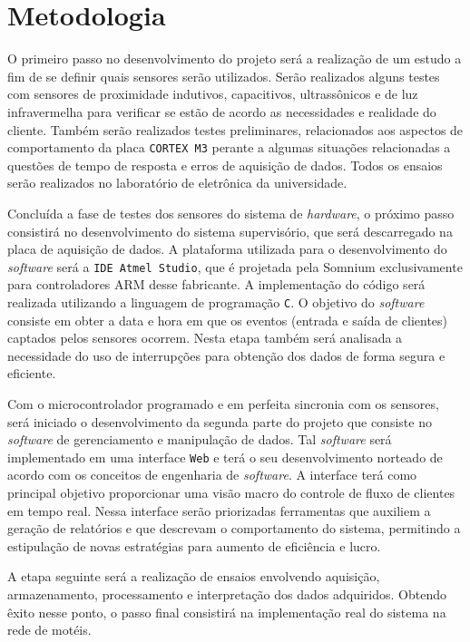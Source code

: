 \chapter[Metodologia]{Metodologia}

O primeiro passo no desenvolvimento do projeto será a realização de um estudo a fim de se definir quais sensores serão utilizados. 
Serão realizados alguns testes com sensores de proximidade indutivos, capacitivos, ultrassônicos e de luz infravermelha para verificar
se estão de acordo as necessidades e realidade do cliente. Também serão realizados testes preliminares, relacionados aos aspectos de 
comportamento da placa \texttt{CORTEX M3} perante a algumas situações relacionadas a questões de tempo de resposta e erros de aquisição de dados. 
Todos os ensaios serão realizados no laboratório de eletrônica da universidade.

Concluída a fase de testes dos sensores do sistema de \textit{hardware}, o próximo passo consistirá no desenvolvimento do sistema supervisório, 
que será descarregado na placa de aquisição de dados. A plataforma utilizada para o desenvolvimento do \textit{software} será a \texttt{IDE Atmel Studio}, 
que é projetada pela Somnium exclusivamente para controladores ARM desse fabricante. A implementação do código será realizada utilizando 
a linguagem de programação \texttt{C}. O objetivo do \textit{software} consiste em obter a data e hora em que os eventos (entrada e saída de clientes) 
captados pelos sensores ocorrem. Nesta etapa também será analisada a necessidade do uso de interrupções para obtenção dos dados de forma 
segura e eficiente.

Com o microcontrolador programado e em perfeita sincronia com os sensores, será iniciado o desenvolvimento da segunda parte do projeto 
que consiste no \textit{software} de gerenciamento e manipulação de dados. Tal \textit{software} será implementado em uma interface \texttt{Web} e terá o seu 
desenvolvimento norteado de acordo com os conceitos de engenharia de \textit{software}. A interface terá como principal objetivo proporcionar 
uma visão macro do controle de fluxo de clientes em tempo real. Nessa interface serão priorizadas ferramentas que auxiliem a geração de 
relatórios e que descrevam o comportamento do sistema, permitindo a estipulação de novas estratégias para aumento de eficiência e lucro. 

A etapa seguinte será a realização de ensaios envolvendo aquisição, armazenamento, processamento e interpretação dos dados adquiridos. 
Obtendo êxito nesse ponto, o passo final consistirá na implementação real do sistema na rede de motéis. 
